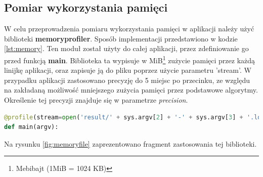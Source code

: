 \subsection{Pomiar wykorzystania pamięci}
\label{ssec:memorymethod}
W celu przeprowadzenia pomiaru wykorzystania pamięci w aplikacji należy użyć biblioteki \textbf{memory\-profiler}. Sposób implementacji przedstawiono w kodzie \ref{lst:memory}. Ten moduł został użyty do całej aplikacji, przez zdefiniowanie go przed funkcją \textbf{main}. Biblioteka ta wypisuje w MiB\footnote{Mebibajt (1MiB = 1024 KB)} zużycie pamięci przez każdą linijkę aplikacji, oraz zapisuje ją do pliku poprzez użycie parametru 'stream'. W przypadku aplikacji zastosowano precyzję do 5 miejsc po przecinku, ze względu na zakładaną możliwość mniejszego zużycia pamięci przez podstawowe algorytmy. Określenie tej precyzji znajduje się w parametrze \emph{precision}.
\begin{lstlisting}[language=Python, caption=Pomiar wykorzystania pamięci, label={lst:memory}]
@profile(stream=open('result/' + sys.argv[2] + '-' + sys.argv[3] + '.log','w+'), precision=4)
def main(argv):
\end{lstlisting}
Na rysunku \ref{fig:memoryfile} zaprezentowano fragment zastosowania tej biblioteki.
